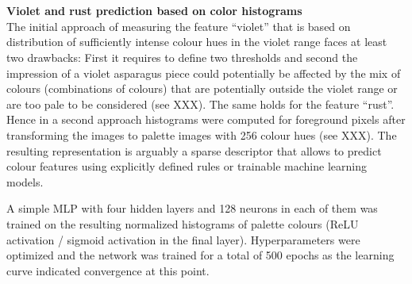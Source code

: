 \\
\\
\textbf{Violet and rust prediction based on color histograms} \\
The initial approach of measuring the feature “violet” that is based on distribution of sufficiently intense colour hues in the violet range faces at least two drawbacks: First it requires to define two thresholds and second the impression of a violet asparagus piece could potentially be affected by the mix of colours (combinations of colours) that are potentially outside the violet range or are too pale to be considered (see XXX). The same holds for the feature “rust”. Hence in a second approach histograms were computed for foreground pixels after transforming the images to palette images with 256 colour hues (see XXX). The resulting representation is arguably a sparse descriptor that allows to predict colour features using explicitly defined rules or trainable machine learning models.

\begin{table}[h]
	\centering
	\caption[??]{\textbf{??}~~~??}
	\label{tab:}
\end{table}

A simple MLP with four hidden layers and 128 neurons in each of them was trained on the resulting normalized histograms of palette colours (ReLU activation / sigmoid activation in the final layer). Hyperparameters were optimized and the network was trained for a total of 500 epochs as the learning curve indicated convergence at this point. \\

